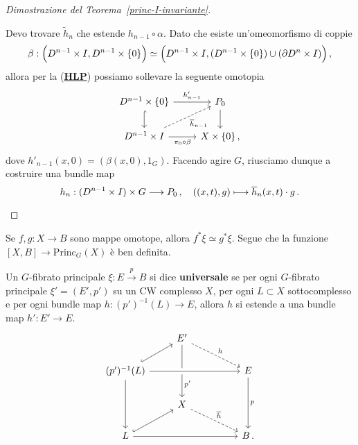 \begin{proof}[Dimostrazione del Teorema~\ref{princ-I-invariante}]
\begin{itemize}
Devo trovare $\widetilde{h}_{n}$ che estende $h_{n-1} \circ \alpha$.
Dato che esiste un'omeomorfismo di coppie
\begin{equation*}
	\beta: \Big(D^{n-1} \times I, D^{n-1} \times \{0\} \Big) \simeq
	\Big(D^{n-1} \times I , (D^{n-1} \times \{0\}) \cup (\partial D^{n} \times I) \Big) \,,
\end{equation*}
allora per la (\hyperref[HLP]{\textbf{HLP}}) possiamo sollevare la seguente omotopia
\begin{equation*}
	\begin{tikzcd}
		D^{n-1} \times \{0\} \ar[r, "h'_{n-1}"] \ar[d, hook]
		& P_{0} \ar[d] \\
		D^{n-1} \times I \ar[r, "\pi_{0} \circ \beta"'] \ar[ur, "\overline{h}_{n-1}"', dashed]
		& X \times \{0\}\,, 
	\end{tikzcd}
\end{equation*}
dove $h'_{n-1}(x,0) = (\beta(x,0),1_{G})$.
Facendo agire $G$, riusciamo dunque a costruire una bundle map 
\begin{equation*}
	h_{n} : (D^{n-1} \times I) \times G \longrightarrow P_{0}\,,
	\quad \left((x,t),g \right) \longmapsto \overline{h}_{n}(x,t) \cdot g\,. \qedhere
\end{equation*}
		\end{itemize}
	\end{proof}

\begin{cor}
	Se $f,g : X \to B$ sono mappe omotope, allora $f^{*}\xi \simeq g^{*}\xi$.
	Segue che la funzione $[X,B] \to \mathrm{Princ}_{G}(X)$ è ben definita.
\end{cor}

\begin{df}
	Un $G$-fibrato principale $\xi:E \xrightarrow{p} B$ si dice \textbf{universale} 
	se per ogni $G$-fibrato principale $\xi' = (E',p')$ su un CW complesso $X$,
	per ogni $L \subset X$ sottocomplesso e per ogni bundle map $h:(p')^{-1}(L) \to E$,
	allora $h$ si estende a una bundle map $h':E' \to E$.
	\begin{equation*}
		\begin{tikzcd}
			& E' \ar[rrd, "h", dashed] \ar[dd, "p'", near end] & & \\
			(p')^{-1}(L) \ar[dd] \ar[ur, hook] \ar[rrr, crossing over] & & & E \ar[dd,"p"] \\
			& X \ar[rrd, "\overline{h}", dashed] & & \\
			L \ar[ur, hook] \ar[rrr] & & & B\,.
		\end{tikzcd}
	\end{equation*}
\end{df}

